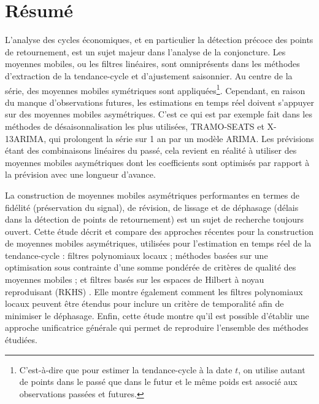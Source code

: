 \thispagestyle{fancy}

\hypertarget{ruxe9sumuxe9}{%
\section*{Résumé}\label{ruxe9sumuxe9}}

L'analyse des cycles économiques, et en particulier la détection précoce
des points de retournement, est un sujet majeur dans l'analyse de la
conjoncture. Les moyennes mobiles, ou les filtres linéaires, sont
omniprésents dans les méthodes d'extraction de la tendance-cycle et
d'ajustement saisonnier. Au centre de la série, des moyennes mobiles
symétriques sont appliquées\footnote{ C'est-à-dire que pour estimer la
  tendance-cycle à la date \(t\), on utilise autant de points dans le
  passé que dans le futur et le même poids est associé aux observations
  passées et futures.}. Cependant, en raison du manque d'observations
futures, les estimations en temps réel doivent s'appuyer sur des
moyennes mobiles asymétriques. C'est ce qui est par exemple fait dans
les méthodes de désaisonnalisation les plus utilisées, TRAMO-SEATS et
X-13ARIMA, qui prolongent la série sur 1 an par un modèle ARIMA. Les
prévisions étant des combinaisons linéaires du passé, cela revient en
réalité à utiliser des moyennes mobiles asymétriques dont les
coefficients sont optimisés par rapport à la prévision avec une longueur
d'avance.

La construction de moyennes mobiles asymétriques performantes en termes
de fidélité (préservation du signal), de révision, de lissage et de
déphasage (délais dans la détection de points de retournement) est un
sujet de recherche toujours ouvert. Cette étude décrit et compare des
approches récentes pour la construction de moyennes mobiles
asymétriques, utilisées pour l'estimation en temps réel de la
tendance-cycle : filtres polynomiaux locaux
\autocite{proietti2008,GrayThomson1996} ; méthodes basées sur une
optimisation sous contrainte d'une somme pondérée de critères de qualité
des moyennes mobiles \autocite{ch15HBSA,trilemmaWMR2019} ; et filtres
basés sur les espaces de Hilbert à noyau reproduisant (RKHS)
\textcite{dagumbianconcini2008}. Elle montre également comment les
filtres polynomiaux locaux peuvent être étendus pour inclure un critère
de temporalité afin de minimiser le déphasage. Enfin, cette étude montre
qu'il est possible d'établir une approche unificatrice générale qui
permet de reproduire l'ensemble des méthodes étudiées.

